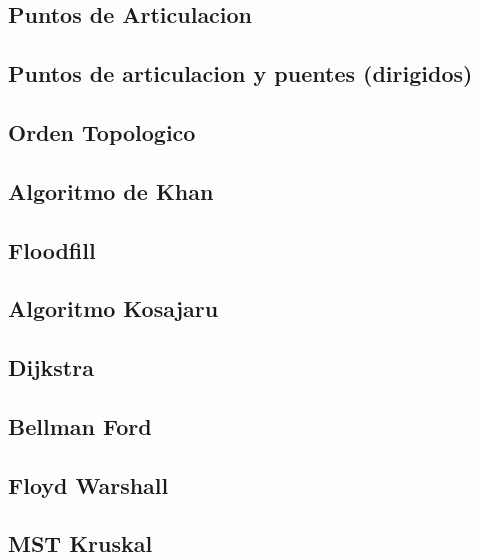 \subsection{Puntos de Articulacion}
\raggedbottom
\hrulefill
\subsection{Puntos de articulacion y puentes (dirigidos)}
\raggedbottom
\hrulefill
\subsection{Orden Topologico}
\raggedbottom
\hrulefill
\subsection{Algoritmo de Khan}
\raggedbottom
\hrulefill
\subsection{Floodfill}
\raggedbottom
\hrulefill
\subsection{Algoritmo Kosajaru}
\raggedbottom
\hrulefill
\subsection{Dijkstra}
\raggedbottom
\hrulefill
\subsection{Bellman Ford}
\raggedbottom
\hrulefill
\subsection{Floyd Warshall}
\raggedbottom
\hrulefill
\subsection{MST Kruskal}
\raggedbottom
\hrulefill
